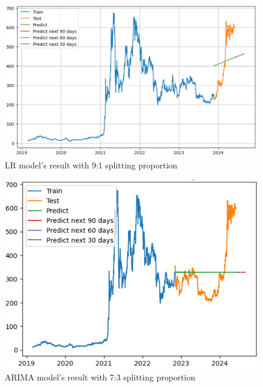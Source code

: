 \documentclass{ieeeojies}
\begin{document}
\begin{figure}[H]
	\centering
	\begin{minipage}{0.8\linewidth}
		\centering
		\includegraphics[width=\linewidth]{bibliography/Images/LR_BNB_91.PNG}
		\caption{LR model's result with 9:1 splitting proportion}
	\end{minipage}
\end{figure}
\begin{figure}[H]
	\centering
	\begin{minipage}{0.8\linewidth}
		\centering
		\includegraphics[width=\linewidth]{bibliography/Images/ARIMA_BNB_73.PNG}
		\caption{ARIMA model's result with 7:3 splitting proportion}
	\end{minipage}
\end{figure}
\end{document}
